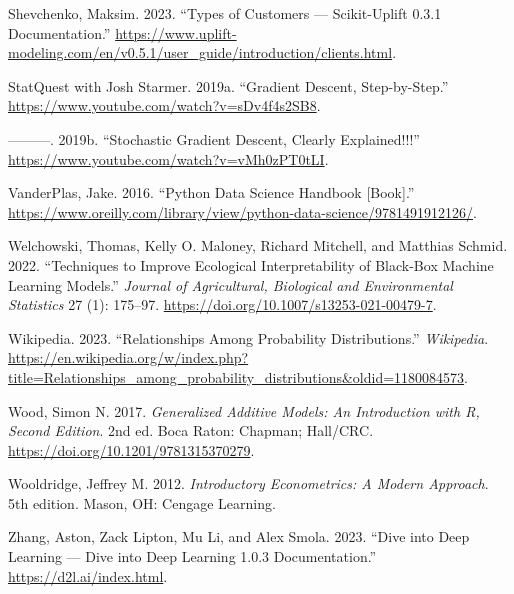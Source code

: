 \documentclass[
  letterpaper,
]{krantz}
\newlength{\cslhangindent}
\newenvironment{CSLReferences}[2] %
 {\begin{list}{}{%
  \setlength{\itemindent}{0pt}
  \setlength{\leftmargin}{0pt}
  \setlength{\parsep}{0pt}
  \ifodd #1
   \setlength{\leftmargin}{\cslhangindent}
   \setlength{\itemindent}{-1\cslhangindent}
  \fi
  \setlength{\itemsep}{#2\baselineskip}}}
 {\end{list}}
\begin{document}
\begin{CSLReferences}{1}{0}
Shevchenko, Maksim. 2023. {``Types of Customers --- Scikit-Uplift 0.3.1
Documentation.''}
\url{https://www.uplift-modeling.com/en/v0.5.1/user_guide/introduction/clients.html}.

StatQuest with Josh Starmer. 2019a. {``Gradient {Descent},
{Step}-by-{Step}.''} \url{https://www.youtube.com/watch?v=sDv4f4s2SB8}.

---------. 2019b. {``Stochastic {Gradient} {Descent}, {Clearly}
{Explained}!!!''} \url{https://www.youtube.com/watch?v=vMh0zPT0tLI}.

VanderPlas, Jake. 2016. {``Python {Data} {Science} {Handbook}
{[}{Book}{]}.''}
\url{https://www.oreilly.com/library/view/python-data-science/9781491912126/}.

Welchowski, Thomas, Kelly O. Maloney, Richard Mitchell, and Matthias
Schmid. 2022. {``Techniques to {Improve} {Ecological} {Interpretability}
of {Black}-{Box} {Machine} {Learning} {Models}.''} \emph{Journal of
Agricultural, Biological and Environmental Statistics} 27 (1): 175--97.
\url{https://doi.org/10.1007/s13253-021-00479-7}.

Wikipedia. 2023. {``Relationships Among Probability Distributions.''}
\emph{Wikipedia}.
\url{https://en.wikipedia.org/w/index.php?title=Relationships_among_probability_distributions&oldid=1180084573}.

Wood, Simon N. 2017. \emph{Generalized {Additive} {Models}: {An}
{Introduction} with {R}, {Second} {Edition}}. 2nd ed. Boca Raton:
Chapman; Hall/CRC. \url{https://doi.org/10.1201/9781315370279}.

Wooldridge, Jeffrey M. 2012. \emph{Introductory {Econometrics}: {A}
{Modern} {Approach}}. 5th edition. Mason, OH: Cengage Learning.

Zhang, Aston, Zack Lipton, Mu Li, and Alex Smola. 2023. {``Dive into
{Deep} {Learning} --- {Dive} into {Deep} {Learning} 1.0.3
Documentation.''} \url{https://d2l.ai/index.html}.

\end{CSLReferences}
\end{document}
